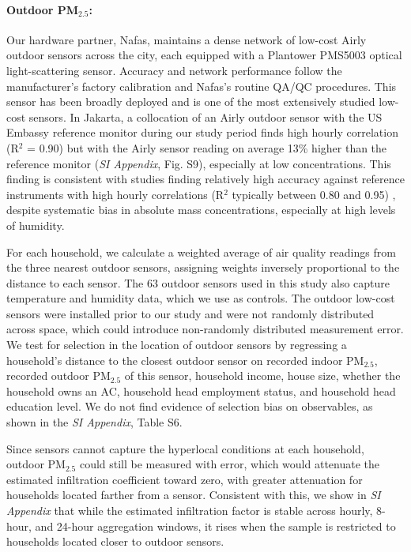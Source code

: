 \documentclass[9pt,twocolumn,twoside]{pnas-new}
\begin{document}
\paragraph{Outdoor PM$_{2.5}$:} Our hardware partner, Nafas, maintains a dense network of low-cost Airly outdoor sensors across the city, each equipped with a Plantower PMS5003 optical light-scattering sensor. Accuracy and network performance follow the manufacturer’s factory calibration and Nafas’s routine QA/QC procedures. This sensor has been broadly deployed and is one of the most extensively studied low-cost sensors. In Jakarta, a collocation of an Airly outdoor sensor with the US Embassy reference monitor during our study period finds high hourly correlation (R$^2$ = 0.90) but with the Airly sensor reading on average 13\% higher than the reference monitor (\textit{SI Appendix}, Fig. S9), especially at low concentrations. This finding is consistent with studies finding relatively high accuracy against reference instruments with high hourly correlations (R$^2$ typically between 0.80 and 0.95) \citep{Sayahi2019, Zheng2018}, despite systematic bias in absolute mass concentrations, especially at high levels of humidity. 

For each household, we calculate a weighted average of air quality readings from the three nearest outdoor sensors, assigning weights inversely proportional to the distance to each sensor. The 63 outdoor sensors used in this study also capture temperature and humidity data, which we use as controls. The outdoor low-cost sensors were installed prior to our study and were not randomly distributed across space, which could introduce non-randomly distributed measurement error. We test for selection in the location of outdoor sensors by regressing a household's distance to the closest outdoor sensor on recorded indoor PM$_{2.5}$, recorded outdoor PM$_{2.5}$ of this sensor, household income, house size, whether the household owns an AC, household head employment status, and household head education level. We do not find evidence of selection bias on observables, as shown in the \textit{SI Appendix}, Table S6.

Since sensors cannot capture the hyperlocal conditions at each household, outdoor PM$_{2.5}$ could still be measured with error, which would attenuate the estimated infiltration coefficient toward zero, with greater attenuation for households located farther from a sensor. Consistent with this, we show in \textit{SI Appendix} that while the estimated infiltration factor is stable across hourly, 8-hour, and 24-hour aggregation windows, it rises when the sample is restricted to households located closer to outdoor sensors.
%
\end{document}
